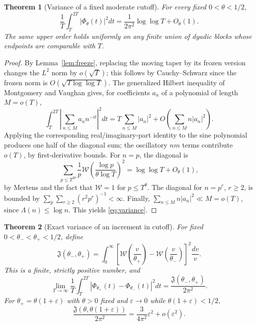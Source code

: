 \documentclass[11pt,leqno]{amsart}
\numberwithin{equation}{section}
\newtheorem{theorem}{Theorem}[section]
\theoremstyle{definition}
\theoremstyle{remark}
\newcommand{\1}{\mathbf 1}
\newcommand{\tW}{\mathscr W}
\begin{document}
\begin{theorem}[Variance of a fixed moderate cutoff]\label{thm:variance}
For every fixed $0<\theta<1/2$,
\begin{equation}\label{eq:variance}
 \boxed{\frac1T\int_T^{2T}|\Phi_\theta(t)|^2dt
 =\frac1{2\pi^2}\log\log T+O_\theta(1).}
\end{equation}
The same upper order holds uniformly on any finite union of dyadic blocks whose endpoints are comparable with $T$.
\end{theorem}
\begin{proof}
By Lemma~\ref{lem:freeze}, replacing the moving taper by its frozen version changes the $L^2$ norm by $o(\sqrt T)$; this follows by Cauchy--Schwarz since the frozen norm is $O(\sqrt{T\log\log T})$. The generalized Hilbert inequality of Montgomery and Vaughan \cite{MV} gives, for coefficients $a_n$ of a polynomial of length $M=o(T)$,
\begin{equation}\label{eq:MV}
 \int_T^{2T}\left|\sum_{n\le M}a_nn^{-it}\right|^2dt
 =T\sum_{n\le M}|a_n|^2+O\left(\sum_{n\le M}n|a_n|^2\right).
\end{equation}
Applying the corresponding real/imaginary-part identity to the sine polynomial produces one half of the diagonal sum; the oscillatory $n m$ terms contribute $o(T)$, by first-derivative bounds. For $n=p$, the diagonal is
\[
 \sum_{p\le T^{2\theta}}
 \frac1p\tW\left(\frac{\log p}{\theta\log T}\right)^2
 =\log\log T+O_\theta(1),
\]
by Mertens and the fact that $\tW=1$ for $p\le T^\theta$. The diagonal for $n=p^r$, $r\ge2$, is bounded by $\sum_p\sum_{r\ge2}(r^2p^r)^{-1}<\infty$. Finally, $\sum_{n\le M}n|a_n|^2\ll M=o(T)$, since $\Lambda(n)\le\log n$. This yields \eqref{eq:variance}.
\end{proof}
\begin{theorem}[Exact variance of an increment in cutoff]\label{thm:increment}
For fixed $0<\theta_-<\theta_+<1/2$, define
\begin{equation}\label{eq:increment-integral}
 \mathfrak J(\theta_-,\theta_+)=\int_0^\infty
 \left[\tW\left(\frac v{\theta_+}\right)-\tW\left(\frac v{\theta_-}\right)\right]^2\frac{dv}{v}.
\end{equation}
This is a finite, strictly positive number, and
\begin{equation}\label{eq:increment}
 \boxed{\lim_{T\to\infty}\frac1T\int_T^{2T}
 |\Phi_{\theta_+}(t)-\Phi_{\theta_-}(t)|^2dt
 =\frac{\mathfrak J(\theta_-,\theta_+)}{2\pi^2}.}
\end{equation}
For $\theta_+=\theta(1+\varepsilon)$ with $\theta>0$ fixed and $\varepsilon\to0$ while $\theta(1+\varepsilon)<1/2$,
\begin{equation}\label{eq:increment-small}
 \frac{\mathfrak J(\theta,\theta(1+\varepsilon))}{2\pi^2}
 =\frac{3}{4\pi^2}\varepsilon^2+o(\varepsilon^2).
\end{equation}
\end{theorem}
\end{document}
